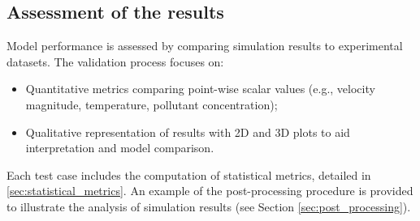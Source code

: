 \subsection{Assessment of the results}
Model performance is assessed by comparing simulation results to experimental datasets. The validation process focuses on:
\begin{itemize}
    \item Quantitative metrics comparing point-wise scalar values (e.g., velocity magnitude, temperature, pollutant concentration);
    \item Qualitative representation of results with 2D and 3D plots to aid interpretation and model comparison.
\end{itemize}

\noindent
Each test case includes the computation of statistical metrics, detailed in \ref{sec:statistical_metrics}. An example of the post-processing procedure is provided to illustrate the analysis of simulation results (see Section \ref{sec:post_processing}).

